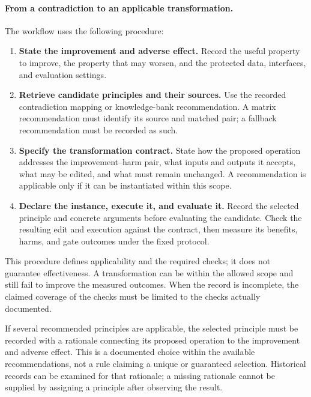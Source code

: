 \documentclass[manuscript,screen,nonacm]{acmart}
\begin{document}
\paragraph{From a contradiction to an applicable transformation.}
The workflow uses the following procedure:
\begin{enumerate}
    \item \textbf{State the improvement and adverse effect.} Record the useful property to improve, the property that may worsen, and the protected data, interfaces, and evaluation settings.
    \item \textbf{Retrieve candidate principles and their sources.} Use the recorded contradiction mapping or knowledge-bank recommendation. A matrix recommendation must identify its source and matched pair; a fallback recommendation must be recorded as such.
    \item \textbf{Specify the transformation contract.} State how the proposed operation addresses the improvement--harm pair, what inputs and outputs it accepts, what may be edited, and what must remain unchanged. A recommendation is applicable only if it can be instantiated within this scope.
    \item \textbf{Declare the instance, execute it, and evaluate it.} Record the selected principle and concrete arguments before evaluating the candidate. Check the resulting edit and execution against the contract, then measure its benefits, harms, and gate outcomes under the fixed protocol.
\end{enumerate}
This procedure defines applicability and the required checks; it does not guarantee effectiveness. A transformation can be within the allowed scope and still fail to improve the measured outcomes. When the record is incomplete, the claimed coverage of the checks must be limited to the checks actually documented.

If several recommended principles are applicable, the selected principle must be recorded with a rationale connecting its proposed operation to the improvement and adverse effect. This is a documented choice within the available recommendations, not a rule claiming a unique or guaranteed selection. Historical records can be examined for that rationale; a missing rationale cannot be supplied by assigning a principle after observing the result.
\end{document}
